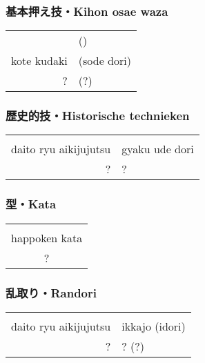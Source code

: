 \subsubsection{基本押え技・Kihon osae waza}
\begin{table}[H]
\begin{center}
\begin{tabular}{rl}
    \ruby{}{}\ruby{}{} & (\ruby{}{})\\
    kote kudaki & (sode dori)\\
    ? & (?)
\end{tabular}
\end{center}
\label{kyuu_4_kihon_osae_waza}
\end{table}

\subsubsection{歴史的技・Historische technieken}
\begin{table}[H]
\begin{center}
\begin{tabular}{rl}
    \ruby{}{}\ruby{}{} & \\
    daito ryu aikijujutsu & gyaku ude dori\\
    ? & ?
\end{tabular}
\end{center}
\label{kyuu_4_historic}
\end{table}

\subsubsection{型・Kata}
\begin{table}[H]
\begin{center}
\begin{tabular}{c}
    \ruby{}{}\ruby{}{}\\
    happoken kata\\
    ?
\end{tabular}
\end{center}
\label{kyuu_4_kata}
\end{table}

\subsubsection{乱取り・Randori}
\begin{table}[H]
\begin{center}
\begin{tabular}{rl}
    \ruby{}{}\ruby{}{} & \\
    daito ryu aikijujutsu & ikkajo (idori)\\
    ? & ? (?)
\end{tabular}
\end{center}
\label{kyuu_4_randori}
\end{table}
